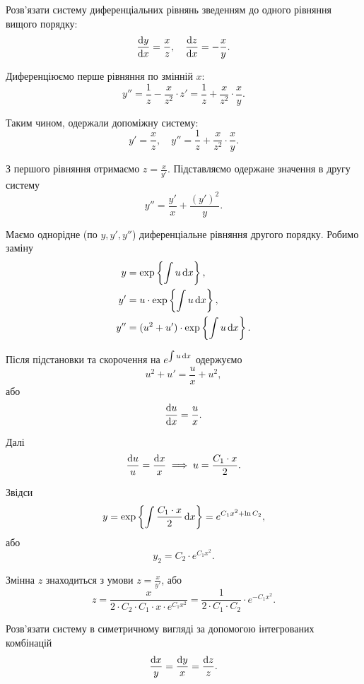 \begin{example}
	Розв'язати систему диференціальних рівнянь зведенням до одного рівняння вищого порядку: \[ \frac{\mathop{}\!\mathrm{d} y}{\mathop{}\!\mathrm{d} x} = \frac{x}{z}, \quad \frac{\mathop{}\!\mathrm{d} z}{\mathop{}\!\mathrm{d} x} = -\frac{x}{y}.\]
\end{example}

\begin{solution}
	Диференціюємо перше рівняння по змінній $x$:
	\[ y'' = \frac{1}{z} - \frac{x}{z^2} \cdot z' = \frac{1}{z} + \frac{x}{z^2} \cdot \frac{x}{y}. \]
	
	Таким чином, одержали допоміжну систему:
	\[ y' = \frac{x}{z}, \quad y'' = \frac{1}{z} + \frac{x}{z^2} \cdot \frac{x}{y}. \]

	З першого рівняння отримаємо $z = \frac{x}{y'}$. Підставляємо одержане значення в другу систему \[ y'' = \frac{y'}{x} + \frac{(y')^2}{y}.\]

	Маємо однорідне (по $y, y', y''$) диференціальне рівняння другого порядку. Робимо заміну \begin{align*} y &= \exp\left\{\int u \mathop{}\!\mathrm{d} x\right\}, \\ y' &= u \cdot \exp\left\{\int u \mathop{}\!\mathrm{d} x\right\}, \\ y'' &= (u^2 + u') \cdot \exp\left\{\int u \mathop{}\!\mathrm{d} x\right\}. \end{align*}

	Після підстановки та скорочення на $e^{\int u \mathop{}\!\mathrm{d} x}$ одержуємо \[ u^2 + u' = \frac{u}{x} + u^2, \] або \[ \frac{\mathop{}\!\mathrm{d} u}{\mathop{}\!\mathrm{d} x} = \frac{u}{x}. \]

	Далі \[ \frac{\mathop{}\!\mathrm{d} u}{u} = \frac{\mathop{}\!\mathrm{d} x}{x} \implies u = \frac{C_1 \cdot x}{2}. \]

	Звідси \[ y = \exp\left\{\int \frac{C_1 \cdot x}{2} \mathop{}\!\mathrm{d} x\right\} = e^{C_1 x^2 + \ln C_2}, \] або \[ y_2 = C_2 \cdot e^{C_1 x^2}. \]

	Змінна $z$ знаходиться з умови $z = \frac{x}{y'}$, або \[ z = \frac{x}{2 \cdot C_2 \cdot C_1 \cdot x \cdot e^{C_1 x^2}} = \frac{1}{2 \cdot C_1 \cdot C_2} \cdot e^{- C_1 x^2}. \]
\end{solution}

\begin{example}
	Розв'язати систему в симетричному вигляді за допомогою інтегрованих комбінацій \[\frac{\mathop{}\!\mathrm{d} x}{y} = \frac{\mathop{}\!\mathrm{d} y}{x} = \frac{\mathop{}\!\mathrm{d} z}{z}.\]
\end{example}

